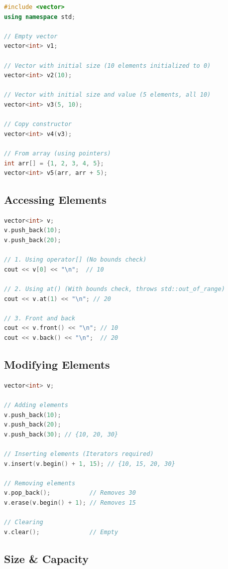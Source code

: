 \begin{lstlisting}[language={C++}]
#include <vector>
using namespace std;

// Empty vector
vector<int> v1;

// Vector with initial size (10 elements initialized to 0)
vector<int> v2(10);

// Vector with initial size and value (5 elements, all 10)
vector<int> v3(5, 10);

// Copy constructor
vector<int> v4(v3);

// From array (using pointers)
int arr[] = {1, 2, 3, 4, 5};
vector<int> v5(arr, arr + 5); 
\end{lstlisting}

\hypertarget{accessing-elements}{%
\subsection{Accessing Elements}\label{accessing-elements}}

\begin{lstlisting}[language={C++}]
vector<int> v;
v.push_back(10);
v.push_back(20);

// 1. Using operator[] (No bounds check)
cout << v[0] << "\n";  // 10

// 2. Using at() (With bounds check, throws std::out_of_range)
cout << v.at(1) << "\n"; // 20

// 3. Front and back
cout << v.front() << "\n"; // 10
cout << v.back() << "\n";  // 20
\end{lstlisting}

\hypertarget{modifying-elements}{%
\subsection{Modifying Elements}\label{modifying-elements}}

\begin{lstlisting}[language={C++}]
vector<int> v;

// Adding elements
v.push_back(10);
v.push_back(20);
v.push_back(30); // {10, 20, 30}

// Inserting elements (Iterators required)
v.insert(v.begin() + 1, 15); // {10, 15, 20, 30}

// Removing elements
v.pop_back();           // Removes 30
v.erase(v.begin() + 1); // Removes 15

// Clearing
v.clear();              // Empty
\end{lstlisting}

\hypertarget{size-capacity}{%
\subsection{Size \& Capacity}\label{size-capacity}}

